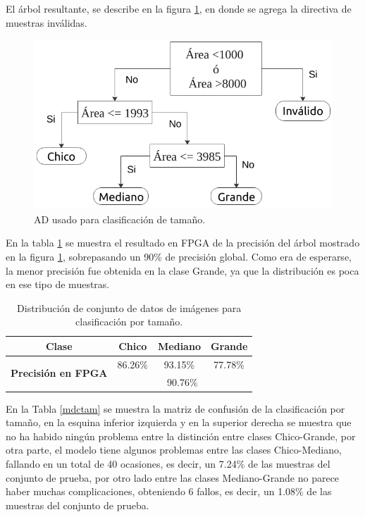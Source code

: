 \documentclass[twoside,spanish,ESP,MSc]{plantillaLabUPV}
\theoremstyle{definition}
\begin{document}
El árbol resultante, se describe en la figura \ref{adareas}, en donde se agrega la directiva de muestras inválidas.

\begin{figure} 
	\centering
	\includegraphics[width=0.8\linewidth]{edrawimas/arboldeareas}
	\caption{AD usado para clasificación de tamaño.}
	\label{adareas}
\end{figure}

En la tabla \ref{acctam} se muestra el resultado en FPGA de la precisión del árbol mostrado en la figura \ref{adareas}, sobrepasando un 90\% de precisión global. Como era de esperarse, la menor precisión fue obtenida en la clase Grande, ya que la distribución es poca en ese tipo de muestras. 

\begin{table}[!tbh]
	\caption{Distribución de conjunto de datos de imágenes para clasificación por tamaño.}
	\label{acctam}
	\centering
	\begin{tabular}{|c|c|c|c|}
		\hline
		\textbf{Clase}                              & \textbf{Chico} & \textbf{Mediano} & \textbf{Grande} \\ \hline
		\multirow{2}{*}{\textbf{Precisión en FPGA}} & 86.26\%        & 93.15\%          & 77.78\%         \\ \cline{2-4} 
		& \multicolumn{3}{c|}{90.76\%}                        \\ \hline
	\end{tabular}
\end{table}

En la Tabla \ref{mdctam} se muestra la matriz de confusión de la clasificación por tamaño, en la esquina inferior izquierda y en la superior derecha se muestra que no ha habido ningún problema entre la distinción entre clases Chico-Grande, por otra parte, el modelo tiene algunos problemas entre las clases Chico-Mediano, fallando en un total de 40 ocasiones, es decir, un 7.24\% de las muestras del conjunto de prueba, por otro lado entre las clases Mediano-Grande no parece haber muchas complicaciones, obteniendo 6 fallos, es decir, un 1.08\% de las muestras del conjunto de prueba. 
\end{document}
